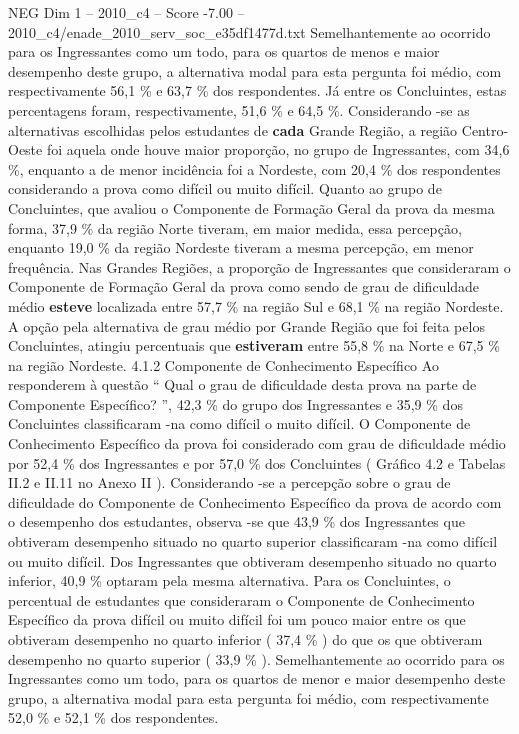 \begin{textsample}{NEG Dim 1 – 2010\_c4 – Score -7.00 – 2010\_c4/enade\_2010\_serv\_soc\_e35df1477d.txt}
Semelhantemente ao ocorrido para os Ingressantes como um todo, para os quartos de menos e maior desempenho deste grupo, a alternativa modal para esta pergunta foi médio, com respectivamente 56,1 \% e 63,7 \% dos respondentes.
Já entre os Concluintes, estas percentagens foram, respectivamente, 51,6 \% e 64,5 \%.
Considerando -se as alternativas escolhidas pelos estudantes de \textbf{cada} Grande Região, a região Centro-Oeste foi aquela onde houve maior proporção, no grupo de Ingressantes, com 34,6 \%, enquanto a de menor incidência foi a Nordeste, com 20,4 \% dos respondentes considerando a prova como difícil ou muito difícil.
Quanto ao grupo de Concluintes, que avaliou o Componente de Formação Geral da prova da mesma forma, 37,9 \% da região Norte tiveram, em maior medida, essa percepção, enquanto 19,0 \% da região Nordeste tiveram a mesma percepção, em menor frequência.
Nas Grandes Regiões, a proporção de Ingressantes que consideraram o Componente de Formação Geral da prova como sendo de grau de dificuldade médio \textbf{esteve} localizada entre 57,7 \% na região Sul e 68,1 \% na região Nordeste.
A opção pela alternativa de grau médio por Grande Região que foi feita pelos Concluintes, atingiu percentuais que \textbf{estiveram} entre 55,8 \% na Norte e 67,5 \% na região Nordeste. 4.1.2 Componente de Conhecimento Específico Ao responderem à questão “ Qual o grau de dificuldade desta prova na parte de Componente Específico? ”, 42,3 \% do grupo dos Ingressantes e 35,9 \% dos Concluintes classificaram -na como difícil o muito difícil.
O Componente de Conhecimento Específico da prova foi considerado com grau de dificuldade médio por 52,4 \% dos Ingressantes e por 57,0 \% dos Concluintes ( Gráfico 4.2 e Tabelas II.2 e II.11 no Anexo II ).
Considerando -se a percepção sobre o grau de dificuldade do Componente de Conhecimento Específico da prova de acordo com o desempenho dos estudantes, observa -se que 43,9 \% dos Ingressantes que obtiveram desempenho situado no quarto superior classificaram -na como difícil ou muito difícil.
Dos Ingressantes que obtiveram desempenho situado no quarto inferior, 40,9 \% optaram pela mesma alternativa.
Para os Concluintes, o percentual de estudantes que consideraram o Componente de Conhecimento Específico da prova difícil ou muito difícil foi um pouco maior entre os que obtiveram desempenho no quarto inferior ( 37,4 \% ) do que os que obtiveram desempenho no quarto superior ( 33,9 \% ).
Semelhantemente ao ocorrido para os Ingressantes como um todo, para os quartos de menor e maior desempenho deste grupo, a alternativa modal para esta pergunta foi médio, com respectivamente 52,0 \% e 52,1 \% dos respondentes.

\end{textsample}

